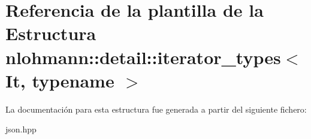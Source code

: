 \hypertarget{structnlohmann_1_1detail_1_1iterator__types}{}\section{Referencia de la plantilla de la Estructura nlohmann\+:\+:detail\+:\+:iterator\+\_\+types$<$ It, typename $>$}
\label{structnlohmann_1_1detail_1_1iterator__types}


La documentación para esta estructura fue generada a partir del siguiente fichero\+:\begin{DoxyCompactItemize}
\item 
json.\+hpp\end{DoxyCompactItemize}
